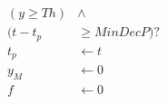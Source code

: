 \documentclass[10pt]{article}
\begin{document}
\begin{align*}(y\geq Th )&\wedge \\(t-t_p &\geq MinDecP)? \\
t_p & \leftarrow t \\
y_{M} & \leftarrow 0 \\
f & \leftarrow 0\end{align*}
\end{document}
